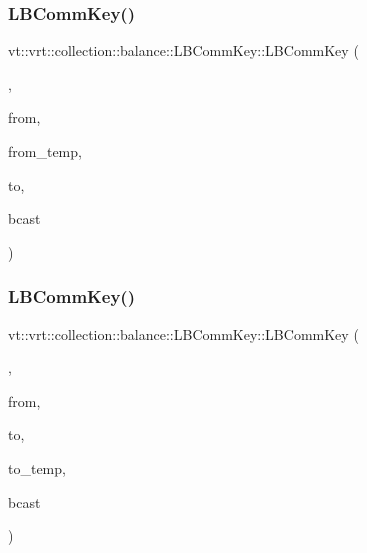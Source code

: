 \subsubsection{\texorpdfstring{L\+B\+Comm\+Key()}{LBCommKey()}\hspace{0.1cm}{\footnotesize\ttfamily [5/6]}}
{\footnotesize\ttfamily vt\+::vrt\+::collection\+::balance\+::\+L\+B\+Comm\+Key\+::\+L\+B\+Comm\+Key (\begin{DoxyParamCaption}\item[{\hyperlink{structvt_1_1vrt_1_1collection_1_1balance_1_1_l_b_comm_key_1_1_collection_to_node_tag}{Collection\+To\+Node\+Tag}}]{,  }\item[{\hyperlink{namespacevt_1_1vrt_1_1collection_1_1balance_a14c8d2c972f2913aa3f1636e5be0a120}{Element\+I\+D\+Type}}]{from,  }\item[{\hyperlink{namespacevt_1_1vrt_1_1collection_1_1balance_a14c8d2c972f2913aa3f1636e5be0a120}{Element\+I\+D\+Type}}]{from\+\_\+temp,  }\item[{\hyperlink{namespacevt_a866da9d0efc19c0a1ce79e9e492f47e2}{Node\+Type}}]{to,  }\item[{bool}]{bcast }\end{DoxyParamCaption})\hspace{0.3cm}{\ttfamily [inline]}}

\mbox{\label{structvt_1_1vrt_1_1collection_1_1balance_1_1_l_b_comm_key_a2f9a95d4de4d824ba4dbdec5eb5317b7}} 
\subsubsection{\texorpdfstring{L\+B\+Comm\+Key()}{LBCommKey()}\hspace{0.1cm}{\footnotesize\ttfamily [6/6]}}
{\footnotesize\ttfamily vt\+::vrt\+::collection\+::balance\+::\+L\+B\+Comm\+Key\+::\+L\+B\+Comm\+Key (\begin{DoxyParamCaption}\item[{\hyperlink{structvt_1_1vrt_1_1collection_1_1balance_1_1_l_b_comm_key_1_1_node_to_collection_tag}{Node\+To\+Collection\+Tag}}]{,  }\item[{\hyperlink{namespacevt_a866da9d0efc19c0a1ce79e9e492f47e2}{Node\+Type}}]{from,  }\item[{\hyperlink{namespacevt_1_1vrt_1_1collection_1_1balance_a14c8d2c972f2913aa3f1636e5be0a120}{Element\+I\+D\+Type}}]{to,  }\item[{\hyperlink{namespacevt_1_1vrt_1_1collection_1_1balance_a14c8d2c972f2913aa3f1636e5be0a120}{Element\+I\+D\+Type}}]{to\+\_\+temp,  }\item[{bool}]{bcast }\end{DoxyParamCaption})\hspace{0.3cm}{\ttfamily [inline]}}



